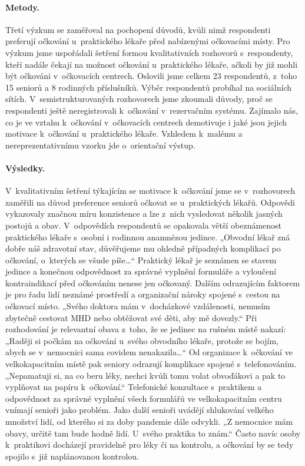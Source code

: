\paragraph*{Metody.}
Třetí výzkum se zaměřoval na pochopení důvodů, kvůli nimž respondenti preferují očkování u~praktického lékaře před nabízenými očkovacími místy. Pro výzkum jsme uspořádali šetření formou kvalitativních rozhovorů s~respondenty, kteří nadále čekají na možnost očkování u~praktického lékaře, ačkoli by již mohli být očkováni v~očkovacích centrech. Oslovili jsme celkem 23 respondentů, z~toho 15 seniorů a 8 rodinných příslušníků. Výběr respondentů probíhal na sociálních sítích. V~semistrukturovaných rozhovorech jsme zkoumali důvody, proč se respondenti ještě neregistrovali k~očkování v~rezervačním systému. Zajímalo nás, co je ve vztahu k~očkování v~očkovacích centrech demotivuje i jaké jsou jejich motivace k~očkování u~praktického lékaře. Vzhledem k~malému a nereprezentativnímu vzorku jde o~orientační výstup. 
 
\paragraph*{Výsledky.}
V~kvalitativním šetření týkajícím se motivace k~očkování jsme se v~rozhovorech zaměřili na důvod preference seniorů očkovat se u~praktických lékařů. Odpovědi vykazovaly značnou míru konzistence a lze z~nich vysledovat několik jasných postojů a obav.
V~odpovědích respondentů se opakovala větší obeznámenost praktického lékaře s~osobní i rodinnou anamnézou jedince. „Obvodní lékař zná dobře náš zdravotní stav, důvěřujeme mu ohledně případných komplikací po očkování, o~kterých se všude píše…“ Praktický lékař je seznámen se stavem jedince a konečnou odpovědnost za správné vyplnění formuláře a vyloučení kontraindikací před očko\-vá\-ním nenese jen očkovaný. 
Dalším odrazujícím faktorem je pro řadu lidí neznámé prostředí a organizační nároky spojené s~cestou na očkovací místo. „Svého doktora mám v~docházkové vzdálenosti, nemusím zbytečně cestovat MHD nebo obtěžovat své děti, aby mě dovezly.“ Při rozhodování je relevantní obava z~toho, že se jedinec na rušném místě nakazí: „Raději si počkám na očkování u~svého obvodního lékaře, protože se bojím, abych se v~nemocnici sama covidem nenakazila…“
Od organizace k~očko\-vá\-ní ve velkokapacitním místě pak seniory odrazují komplikace spojené s~telefonováním. „Nepamatuji si, na co beru léky, nechci kvůli tomu volat obvoďákovi a pak to vyplňovat na papíru k~očkování.“ Telefonické konzultace s~praktikem a odpovědnost za správné vyplnění všech formulářů ve velkokapacitním centru vnímají senioři jako problém. Jako další senioři uvádějí shlukování velkého množství lidí, od kterého si za doby pandemie dále odvykli. „Z nemocnice mám obavy, určitě tam bude hodně lidí. U~svého praktika to znám.“ Často navíc osoby k~praktikovi docházejí pravidelně pro léky či na kontrolu, a očkování by se tedy spojilo s~již naplánovanou kontrolou.

